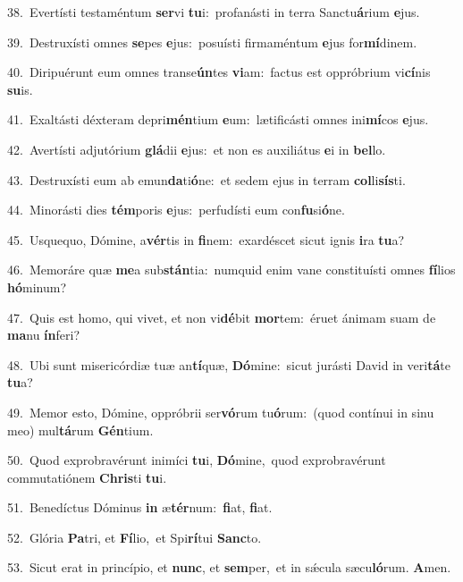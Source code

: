 {\numbfont\textcolor{\numbcolor}{38.}}~Evertísti testaméntum \textbf{ser}\-vi \textbf{tu}\-i:~\star profanásti in terra Sanctu\-\textbf{á}\-rium \textbf{e}\-jus.\par
{\numbfont\textcolor{\numbcolor}{39.}}~Destruxísti omnes \textbf{se}\-pes \textbf{e}\-jus:~\star posuísti firmaméntum \textbf{e}\-jus for\-\textbf{mí}\-dinem.\par
{\numbfont\textcolor{\numbcolor}{40.}}~Diripuérunt eum omnes transe\-\textbf{ún}\-tes \textbf{vi}\-am:~\star factus est oppróbrium vi\-\textbf{cí}\-nis \textbf{su}\-is.\par
{\numbfont\textcolor{\numbcolor}{41.}}~Exaltásti déxteram depri\-\textbf{mén}\-tium \textbf{e}\-um:~\star lætificásti omnes ini\-\textbf{mí}\-cos \textbf{e}\-jus.\par
{\numbfont\textcolor{\numbcolor}{42.}}~Avertísti adjutórium \textbf{glá}\-dii \textbf{e}\-jus:~\star et non es auxiliátus \textbf{e}\-i in \textbf{bel}\-lo.\par
{\numbfont\textcolor{\numbcolor}{43.}}~Destruxísti eum ab emun\-\textbf{da}\-ti\-\textbf{ó}\-ne:~\star et sedem ejus in terram \textbf{col}\-li\-\textbf{sís}\-ti.\par
{\numbfont\textcolor{\numbcolor}{44.}}~Minorásti dies \textbf{tém}\-poris \textbf{e}\-jus:~\star perfudísti eum con\-\textbf{fu}\-si\-\textbf{ó}\-ne.\par
{\numbfont\textcolor{\numbcolor}{45.}}~Usquequo, Dómine, a\-\textbf{vér}\-tis in \textbf{fi}\-nem:~\star exardéscet sicut ignis \textbf{i}\-ra \textbf{tu}\-a?\par
{\numbfont\textcolor{\numbcolor}{46.}}~Memoráre quæ \textbf{me}\-a sub\-\textbf{stán}\-tia:~\star numquid enim vane constituísti omnes \textbf{fí}\-lios \textbf{hó}\-minum?\par
{\numbfont\textcolor{\numbcolor}{47.}}~Quis est homo, qui vivet, et non vi\-\textbf{dé}\-bit \textbf{mor}\-tem:~\star éruet ánimam suam de \textbf{ma}\-nu \textbf{ín}\-feri?\par
{\numbfont\textcolor{\numbcolor}{48.}}~Ubi sunt misericórdiæ tuæ an\-\textbf{tí}\-quæ, \textbf{Dó}\-mine:~\star sicut jurásti David in veri\-\textbf{tá}\-te \textbf{tu}\-a?\par
{\numbfont\textcolor{\numbcolor}{49.}}~Memor esto, Dómine, oppróbrii ser\-\textbf{vó}\-rum tu\-\textbf{ó}\-rum:~\star (quod contínui in sinu meo) mul\-\textbf{tá}\-rum \textbf{Gén}\-tium.\par
{\numbfont\textcolor{\numbcolor}{50.}}~Quod exprobravérunt inimíci \textbf{tu}\-i, \textbf{Dó}\-mine,~\star quod exprobravérunt commutatiónem \textbf{Chris}\-ti \textbf{tu}\-i.\par
{\numbfont\textcolor{\numbcolor}{51.}}~Benedíctus Dóminus \textbf{in} æ\-\textbf{tér}\-num:~\star \textbf{fi}\-at, \textbf{fi}\-at.\par
{\numbfont\textcolor{\numbcolor}{52.}}~Glória \textbf{Pa}\-tri, et \textbf{Fí}\-lio,~\star et Spi\-\textbf{rí}\-tui \textbf{Sanc}\-to.\par
{\numbfont\textcolor{\numbcolor}{53.}}~Sicut erat in princípio, et \textbf{nunc}\-, et \textbf{sem}\-per,~\star et in sǽcula sæcu\-\textbf{ló}\-rum. \textbf{A}\-men.\par
